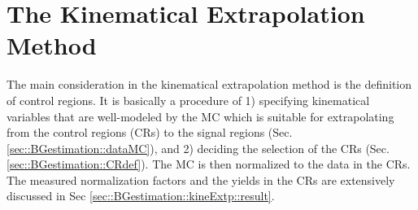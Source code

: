 \section{The Kinematical Extrapolation Method} \label{sec::BGestimation::kineExtp}
The main consideration in the kinematical extrapolation method is the definition of control regions.
It is basically a procedure of 1) specifying kinematical variables that are well-modeled by the MC which is suitable for extrapolating from the control regions (CRs) to the signal regions (Sec. \ref{sec::BGestimation::dataMC}), and 2) deciding the selection of the CRs (Sec. \ref{sec::BGestimation::CRdef}). 
The MC is then normalized to the data in the CRs. The measured normalization factors and the yields in the CRs are extensively discussed in Sec \ref{sec::BGestimation::kineExtp::result}.

